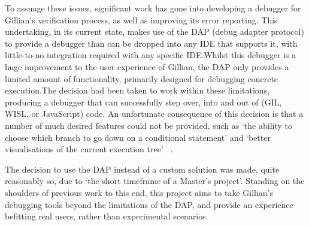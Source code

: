 To assuage these issues, significant work has gone into developing a debugger
for Gillian's verification process, as well as improving its error reporting.
This undertaking, in its current state, makes use of the DAP (debug adapter
protocol) to provide a debugger than can be dropped into any IDE that supports
it, with little-to-no integration required with any specific IDE.\@ Whilst this
debugger is a huge improvement to the user experience of Gillian, the DAP only
provides a limited amount of functionality, primarily designed for debugging
concrete execution.\@ The decision had been taken to work within these
limitations, producing a debugger that can successfully step over, into and out
of (GIL, WISL, or JavaScript) code. An unfortunate consequence of this decision
is that a number of much desired features could not be provided, such as `the
ability to choose which branch to go down on a conditional statement' and
`better visualisations of the current execution tree'
~\cite[p.~49]{gillian-debugging-2021}.

The decision to use the DAP instead of a custom solution was made, quite
reasonably so, due to `the short timeframe of a Master's project'. Standing on
the shoulders of previous work to this end, this project aims to take Gillian's
debugging tools beyond the limitations of the DAP, and provide an experience
befitting real users, rather than experimental scenarios. 
